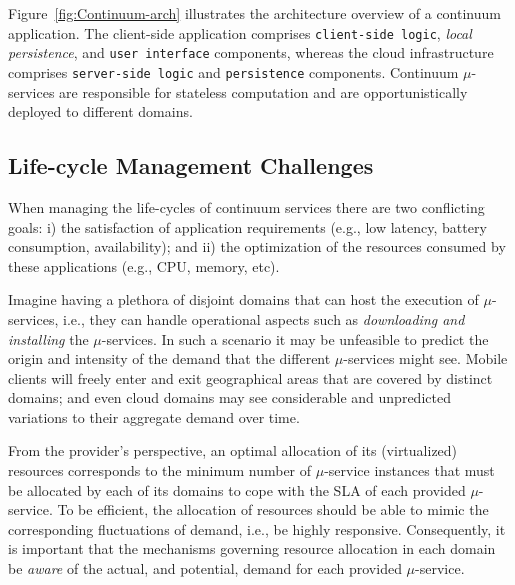 Figure~\ref{fig:Continuum-arch} illustrates the architecture overview of a continuum application. The client-side application comprises \texttt{client-side logic}, \textit{local persistence}, and \texttt{user interface} components, whereas the cloud infrastructure comprises \texttt{server-side logic} and \texttt{persistence} components. Continuum $\mu$-services are responsible for stateless computation and are opportunistically deployed to different domains.

\subsection{Life-cycle Management Challenges}


When managing the life-cycles of continuum services there are two conflicting goals: i) the satisfaction of application requirements (e.g., low latency, battery consumption, availability); and ii) the optimization of the resources consumed by these applications (e.g., CPU, memory, etc). 

Imagine having a plethora of disjoint domains that can host the execution of $\mu$-services, i.e., they can handle operational aspects such as \textit{downloading and installing} the $\mu$-services. In such a scenario it may be unfeasible to predict the origin and intensity of the demand that the different $\mu$-services might see. Mobile clients will freely enter and exit geographical areas that are covered by distinct domains; and even cloud domains may see considerable and unpredicted variations to their aggregate demand over time. 

From the provider's perspective, an optimal allocation of its (virtualized) resources corresponds to the minimum number of $\mu$-service instances that must be allocated by each of its domains to cope with the SLA of each provided $\mu$-service. To be efficient, the allocation of resources should be able to mimic the corresponding fluctuations of demand, i.e., be highly responsive. Consequently, it is important that the mechanisms governing resource allocation in each domain be \textit{aware} of the actual, and potential, demand for each provided $\mu$-service. 

